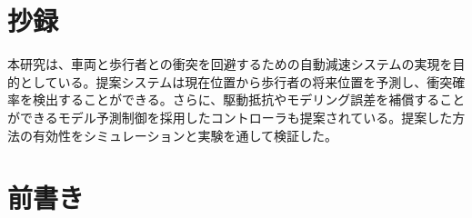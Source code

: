 

\pagestyle{fancy}
\section{抄録}
本研究は、車両と歩行者との衝突を回避するための自動減速システムの実現を目的としている。提案システムは現在位置から歩行者の将来位置を予測し、衝突確率を検出することができる。さらに、駆動抵抗やモデリング誤差を補償することができるモデル予測制御を採用したコントローラも提案されている。提案した方法の有効性をシミュレーションと実験を通して検証した。

\section{前書き}


